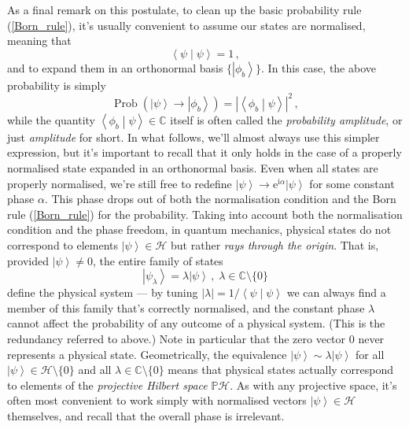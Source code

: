 \documentclass{article}
\theoremstyle{plain}\theoremheaderfont{\normalfont\itshape}\theorembodyfont{\rmfamily}\theoremseparator{.}\newtheorem*{rem}{Remark}\newtheorem*{ex}{Example}\newtheorem*{proof}{Proof}\newtheorem*{altp}{Alternative proof}
\theoremstyle{plain}\theoremheaderfont{\normalfont\bfseries}\theorembodyfont{\rmfamily}\theoremseparator{.}\newtheorem{thm}{Theorem}[section]\newtheorem{lem}[thm]{Lemma}\newtheorem{prop}[thm]{Proposition}\newtheorem*{cor}{Corollary}\newtheorem{defn}[thm]{Definition}\newtheorem{clm}[thm]{Claim}\newtheorem{clminproof}{Claim}
\theoremstyle{break}\theoremheaderfont{\normalfont\itshape}\theorembodyfont{\rmfamily}\theoremseparator{.\medskip}\newtheorem*{proofskip}{Proof}\newtheorem*{exs}{Examples}\newtheorem*{rems}{Remarks}
\theoremstyle{break}\theoremheaderfont{\normalfont\bfseries}\theorembodyfont{\rmfamily}\theoremseparator{.\medskip}\newtheorem{lemskip}[thm]{Lemma}\newtheorem{defnskip}[thm]{Definition}\newtheorem{propskip}[thm]{Proposition}\newtheorem{thmskip}[thm]{Theorem}
\numberwithin{equation}{section}
\newcommand{\ii}{\mathrm{i}}
\newcommand{\ee}{\mathrm{e}}
\newcommand{\ket}[1]{\left| #1 \right\rangle}
\newcommand{\braket}[2]{\left\langle #1 \middle| #2 \right\rangle}
\newcommand{\vb}[1]{\bm{\mathrm{#1}}}
\newcommand{\abs}[1]{\left| #1 \right|}
\newcommand{\hb}{\mathcal{H}}
\newcommand{\ph}{\mathbb{P}\mathcal{H}}
\DeclareMathOperator{\Prob}{Prob}
\newcommand{\CC}{\mathbb{C}}
\begin{document}
    As a final remark on this postulate, to clean up the basic probability rule (\ref{Born_rule}), it's usually convenient to assume our states are normalised, meaning that
    \begin{equation}
        \braket{\psi}{\psi}=1\,,
    \end{equation}
    and to expand them in an orthonormal basis \(\{\ket{\phi_b}\}\). In this case, the above probability is simply
    \begin{equation}
        \Prob(\ket{\psi}\to\ket{\phi_b})=\abs{\braket{\phi_b}{\psi}}^2\,,
    \end{equation}
    while the quantity \(\braket{\phi_b}{\psi}\in\CC\) itself is often called the \textit{probability amplitude}, or just \textit{amplitude} for short. In what follows, we'll almost always use this simpler expression, but it's important to recall that it only holds in the case of a properly normalised state expanded in an orthonormal basis. Even when all states are properly normalised, we're still free to redefine \(\ket{\psi}\to \ee^{\ii \alpha}\ket{\psi}\) for some constant phase \(\alpha\). This phase drops out of both the normalisation condition and the Born rule (\ref{Born_rule}) for the probability. Taking into account both the normalisation condition and the phase freedom, in quantum mechanics, physical states do not correspond to elements \(\ket{\psi}\in\hb\) but rather \textit{rays through the origin}. That is, provided \(\ket{\psi}\ne\vb{0}\), the entire family of states
    \begin{equation}
        \ket{\psi_\lambda}=\lambda\ket{\psi}\,,\;\lambda\in\CC\setminus\{0\}
    \end{equation}
    define the physical system --- by tuning \(\abs{\lambda}=1/\braket{\psi}{\psi}\) we can always find a member of this family that's correctly normalised, and the constant phase \(\lambda\) cannot affect the probability of any outcome of a physical system. (This is the redundancy referred to above.) Note in particular that the zero vector \(\vb{0}\) never represents a physical state. Geometrically, the equivalence \(\ket{\psi}\sim\lambda\ket{\psi}\) for all \(\ket{\psi}\in\hb\setminus\{\vb{0}\}\) and all \(\lambda\in\CC\setminus\{0\}\) means that physical states actually correspond to elements of the \textit{projective Hilbert space} \(\ph\). As with any projective space, it's often most convenient to work simply with normalised vectors \(\ket{\psi}\in\hb\) themselves, and recall that the overall phase is irrelevant.
\end{document}
